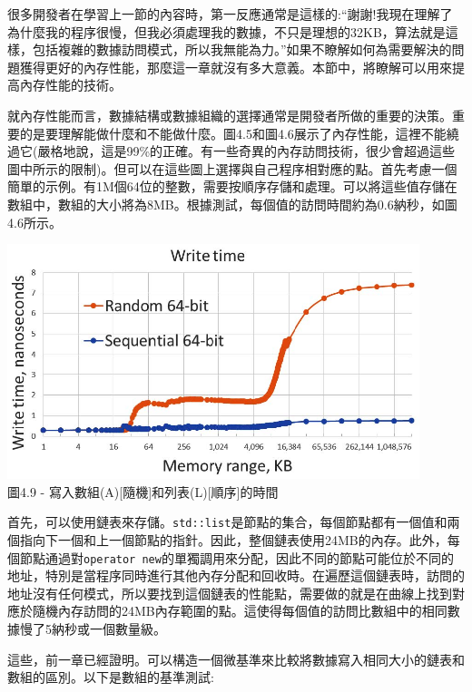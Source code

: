 
很多開發者在學習上一節的內容時，第一反應通常是這樣的:“謝謝!我現在理解了為什麼我的程序很慢，但我必須處理我的數據，不只是理想的32KB，算法就是這樣，包括複雜的數據訪問模式，所以我無能為力。”如果不瞭解如何為需要解決的問題獲得更好的內存性能，那麼這一章就沒有多大意義。本節中，將瞭解可以用來提高內存性能的技術。


就內存性能而言，數據結構或數據組織的選擇通常是開發者所做的重要的決策。重要的是要理解能做什麼和不能做什麼。圖4.5和圖4.6展示了內存性能，這裡不能繞過它(嚴格地說，這是99\%的正確。有一些奇異的內存訪問技術，很少會超過這些圖中所示的限制)。但可以在這些圖上選擇與自己程序相對應的點。首先考慮一個簡單的示例。有1M個64位的整數，需要按順序存儲和處理。可以將這些值存儲在數組中，數組的大小將為8MB。根據測試，每個值的訪問時間約為0.6納秒，如圖4.6所示。

\begin{center}
\includegraphics[width=0.9\textwidth]{content/1/chapter4/images/9.jpg}\\
圖4.9 - 寫入數組(A)[隨機]和列表(L)[順序]的時間
\end{center}

首先，可以使用鏈表來存儲。\texttt{std::list}是節點的集合，每個節點都有一個值和兩個指向下一個和上一個節點的指針。因此，整個鏈表使用24MB的內存。此外，每個節點通過對\texttt{operator new}的單獨調用來分配，因此不同的節點可能位於不同的地址，特別是當程序同時進行其他內存分配和回收時。在遍歷這個鏈表時，訪問的地址沒有任何模式，所以要找到這個鏈表的性能點，需要做的就是在曲線上找到對應於隨機內存訪問的24MB內存範圍的點。這使得每個值的訪問比數組中的相同數據慢了5納秒或一個數量級。

這些，前一章已經證明。可以構造一個微基準來比較將數據寫入相同大小的鏈表和數組的區別。以下是數組的基準測試:

